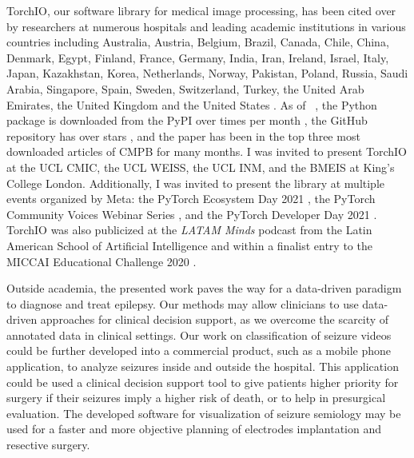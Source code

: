 TorchIO, our software library for medical image processing,
has been cited over \torchiocitations by researchers
at numerous hospitals and leading academic institutions in various countries including
Australia, Austria, Belgium, Brazil, Canada, Chile, China, Denmark, Egypt, Finland, France, Germany, India, Iran, Ireland, Israel, Italy, Japan, Kazakhstan, Korea, Netherlands, Norway, Pakistan, Poland, Russia, Saudi Arabia, Singapore, Spain, Sweden, Switzerland, Turkey, the United Arab Emirates, the United Kingdom and the United States%
.
As of \monthname~\the\year, the Python package is downloaded from the \ac{PyPI} over \torchiomonthdownloads times per month%
,
the GitHub repository has over \torchiostars stars%
,
and the paper has been in the top three most downloaded articles of \ac{CMPB}%
for many months.
I was invited to present TorchIO at
the UCL \ac{CMIC},
the UCL \ac{WEISS},
the UCL \ac{INM}, and
the \ac{BMEIS} at King's College London.
Additionally, I was invited to present the library at multiple events organized by Meta: the PyTorch Ecosystem Day 2021%
,
the PyTorch Community Voices Webinar Series%
,
and the PyTorch Developer Day 2021%
.
TorchIO was also publicized at the \textit{LATAM Minds} podcast from the Latin American School of Artificial Intelligence%
and within a finalist entry to the MICCAI Educational Challenge 2020%
.

Outside academia, the presented work paves the way for a data-driven paradigm to diagnose and treat epilepsy.
Our methods may allow clinicians to use data-driven approaches for clinical decision support, as we overcome the scarcity of annotated data in clinical settings.
Our work on classification of seizure videos could be further developed into a commercial product, such as a mobile phone application, to analyze seizures inside and outside the hospital.
This application could be used a clinical decision support tool to give patients higher priority for surgery if their seizures imply a higher risk of death, or to help in presurgical evaluation.
The developed software for visualization of seizure semiology may be used for a faster and more objective planning of electrodes implantation and resective surgery.


